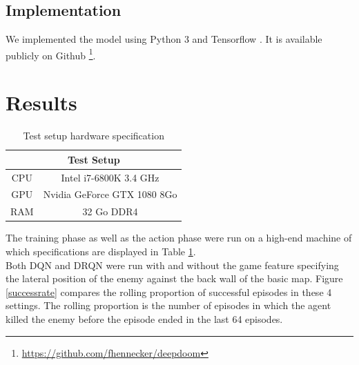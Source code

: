 \documentclass[letterpaper]{article}
\newcommand\Tstrut{\rule{0pt}{2.6ex}}
\begin{document}
\subsection{Implementation}
We implemented the model using Python 3 and Tensorflow \citep{tensorflow}.
It is available publicly on Github
\footnote{\url{https://github.com/fhennecker/deepdoom}}.



\section{Results}
%

\begin{table}[h]
\centering
\begin{tabular}{cc}
\multicolumn{2}{c}{Test Setup}                         \Tstrut\\ \hline
\multicolumn{1}{c|}{CPU} & Intel i7-6800K 3.4 GHz      \Tstrut\\
\multicolumn{1}{c|}{GPU} & Nvidia GeForce GTX 1080 8Go \Tstrut\\
\multicolumn{1}{c|}{RAM} & 32 Go DDR4                      \Tstrut
\end{tabular}
\caption{Test setup hardware specification}
\label{tab:specs}
\end{table}

The training phase as well as the action phase were run on a high-end machine
of which specifications are displayed in Table \ref{tab:specs}.\\

Both DQN and DRQN were run with and without the game feature specifying the 
lateral position of the enemy against the back wall of the basic map. Figure
\ref{successrate} compares the rolling proportion of successful episodes
in these 4 settings. The rolling proportion is the number of episodes in which
the agent killed the enemy before the episode ended in the last 64 episodes.
\end{document}
